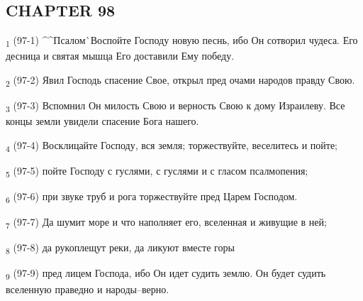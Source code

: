 \subsection{CHAPTER 98}
\begin{tcolorbox}
\textsubscript{1} (97-1) ^^Псалом^^ Воспойте Господу новую песнь, ибо Он сотворил чудеса. Его десница и святая мышца Его доставили Ему победу.
\end{tcolorbox}
\begin{tcolorbox}
\textsubscript{2} (97-2) Явил Господь спасение Свое, открыл пред очами народов правду Свою.
\end{tcolorbox}
\begin{tcolorbox}
\textsubscript{3} (97-3) Вспомнил Он милость Свою и верность Свою к дому Израилеву. Все концы земли увидели спасение Бога нашего.
\end{tcolorbox}
\begin{tcolorbox}
\textsubscript{4} (97-4) Восклицайте Господу, вся земля; торжествуйте, веселитесь и пойте;
\end{tcolorbox}
\begin{tcolorbox}
\textsubscript{5} (97-5) пойте Господу с гуслями, с гуслями и с гласом псалмопения;
\end{tcolorbox}
\begin{tcolorbox}
\textsubscript{6} (97-6) при звуке труб и рога торжествуйте пред Царем Господом.
\end{tcolorbox}
\begin{tcolorbox}
\textsubscript{7} (97-7) Да шумит море и что наполняет его, вселенная и живущие в ней;
\end{tcolorbox}
\begin{tcolorbox}
\textsubscript{8} (97-8) да рукоплещут реки, да ликуют вместе горы
\end{tcolorbox}
\begin{tcolorbox}
\textsubscript{9} (97-9) пред лицем Господа, ибо Он идет судить землю. Он будет судить вселенную праведно и народы--верно.
\end{tcolorbox}
